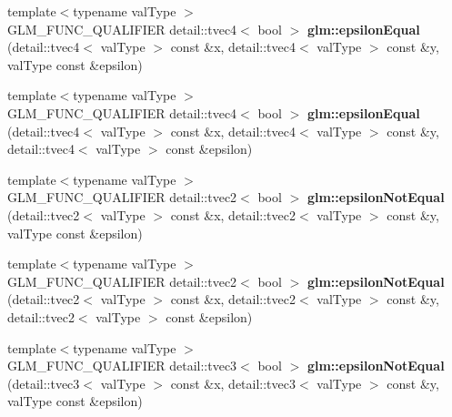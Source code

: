 \begin{DoxyCompactItemize}
\item 
\hypertarget{namespaceglm_ae90639fa7003f447e9a4ff40e6f3961d}{}{\footnotesize template$<$typename val\+Type $>$ }\\G\+L\+M\+\_\+\+F\+U\+N\+C\+\_\+\+Q\+U\+A\+L\+I\+F\+I\+E\+R detail\+::tvec4$<$ bool $>$ {\bfseries glm\+::epsilon\+Equal} (detail\+::tvec4$<$ val\+Type $>$ const \&x, detail\+::tvec4$<$ val\+Type $>$ const \&y, val\+Type const \&epsilon)\label{namespaceglm_ae90639fa7003f447e9a4ff40e6f3961d}

\item 
\hypertarget{namespaceglm_ab9242e7cebbfedd683fc1dc9ac9195ee}{}{\footnotesize template$<$typename val\+Type $>$ }\\G\+L\+M\+\_\+\+F\+U\+N\+C\+\_\+\+Q\+U\+A\+L\+I\+F\+I\+E\+R detail\+::tvec4$<$ bool $>$ {\bfseries glm\+::epsilon\+Equal} (detail\+::tvec4$<$ val\+Type $>$ const \&x, detail\+::tvec4$<$ val\+Type $>$ const \&y, detail\+::tvec4$<$ val\+Type $>$ const \&epsilon)\label{namespaceglm_ab9242e7cebbfedd683fc1dc9ac9195ee}

\item 
\hypertarget{namespaceglm_a6a33cb9002c3189710482071fd0f4a4d}{}{\footnotesize template$<$typename val\+Type $>$ }\\G\+L\+M\+\_\+\+F\+U\+N\+C\+\_\+\+Q\+U\+A\+L\+I\+F\+I\+E\+R detail\+::tvec2$<$ bool $>$ {\bfseries glm\+::epsilon\+Not\+Equal} (detail\+::tvec2$<$ val\+Type $>$ const \&x, detail\+::tvec2$<$ val\+Type $>$ const \&y, val\+Type const \&epsilon)\label{namespaceglm_a6a33cb9002c3189710482071fd0f4a4d}

\item 
\hypertarget{namespaceglm_a12da3487c04448e21ce83c45e78fcc96}{}{\footnotesize template$<$typename val\+Type $>$ }\\G\+L\+M\+\_\+\+F\+U\+N\+C\+\_\+\+Q\+U\+A\+L\+I\+F\+I\+E\+R detail\+::tvec2$<$ bool $>$ {\bfseries glm\+::epsilon\+Not\+Equal} (detail\+::tvec2$<$ val\+Type $>$ const \&x, detail\+::tvec2$<$ val\+Type $>$ const \&y, detail\+::tvec2$<$ val\+Type $>$ const \&epsilon)\label{namespaceglm_a12da3487c04448e21ce83c45e78fcc96}

\item 
\hypertarget{namespaceglm_a466bb0e71cb9bde8a20c842e48b19338}{}{\footnotesize template$<$typename val\+Type $>$ }\\G\+L\+M\+\_\+\+F\+U\+N\+C\+\_\+\+Q\+U\+A\+L\+I\+F\+I\+E\+R detail\+::tvec3$<$ bool $>$ {\bfseries glm\+::epsilon\+Not\+Equal} (detail\+::tvec3$<$ val\+Type $>$ const \&x, detail\+::tvec3$<$ val\+Type $>$ const \&y, val\+Type const \&epsilon)\label{namespaceglm_a466bb0e71cb9bde8a20c842e48b19338}


\end{DoxyCompactItemize}
